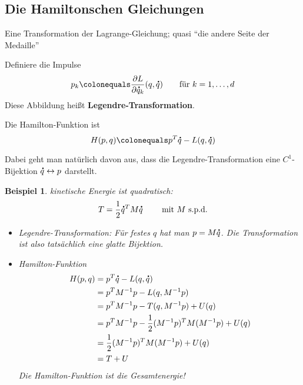 \documentclass[german]{scrreprt}
\let\emph\textbf
\theoremstyle{plain}
\theoremstyle{nonumberplain}
\theoremstyle{nonumberplain}
\newtheorem{bsp}{Beispiel}
\theoremstyle{nonumberplain}
\renewcommand*{\dot}[1]{\accentset{\mbox{\large\bfseries .}}{#1}}
\begin{document}

\renewcommand*\contentsname{\huge \centering Optimierung \& Numerik --- Vorlesung 13}
\tableofcontents


\setcounter{chapter}{12}
\setcounter{section}{1}
\setcounter{satz}{1}
\setcounter{lemma}{0}
\setcounter{equation}{0}

\subsection{Die Hamiltonschen Gleichungen}

Eine Transformation der Lagrange-Gleichung; quasi \enquote{die andere Seite der Medaille}

Definiere die Impulse
\begin{equation*}
p_k \colonequals \frac{\partial L}{\partial \dot q_k}(q, \dot q) \qquad \text{für } k = 1, \dots, d
\end{equation*}
Diese Abbildung heißt \emph{Legendre-Transformation}.

\begin{definition}
	Die Hamilton-Funktion ist
	\begin{equation*}
	H(p, q) \colonequals p^T \dot q - L(q, \dot q)
	\end{equation*}
\end{definition}

Dabei geht man natürlich davon aus, dass die Legendre-Transformation eine $C^1$-Bijektion $\dot q \leftrightarrow p$ darstellt.

\begin{bsp}
	kinetische Energie ist quadratisch:
	\begin{equation*}
	T = \frac 12 \dot q^T M \dot q \qquad \text{ mit $M$ s.p.d.}
	\end{equation*}
	
	\begin{itemize}
		\item Legendre-Transformation: Für festes $q$ hat man $p = M \dot q$. Die Transformation ist also tatsächlich eine glatte Bijektion.
		\item Hamilton-Funktion
		\begin{align*}
		H(p, q)
		& = p^T \dot q - L(q, \dot q) \\
		& = p^T M^{-1} p - L(q, M^{-1} p) \\
		& = p^T M^{-1} p - T(q, M^{-1} p) + U(q) \\
		& = p^T M^{-1} p - \frac12 (M^{-1}p)^T M (M^{-1} p) + U(q) \\
		& = \frac12 (M^{-1}p)^T M (M^{-1}p) + U(q) \\
		& = T + U
		\end{align*}
		Die Hamilton-Funktion ist die Gesamtenergie!
	\end{itemize}
\end{bsp}
\end{document}
